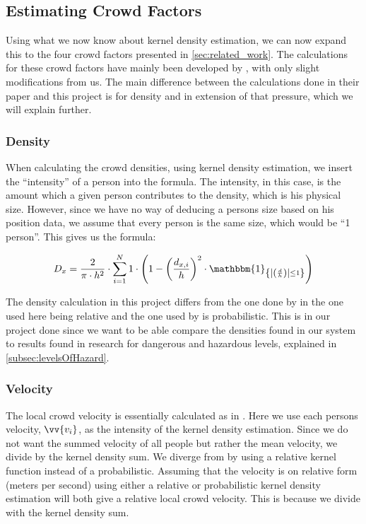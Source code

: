 \subsection{Estimating Crowd Factors}
\label{subsec:estimatingCrowdFactors}
Using what we now know about kernel density estimation, we can now expand this to the four crowd factors presented in \cref{sec:related_work}. The calculations for these crowd factors have mainly been developed by \citet{wirz2012inferring}, with only slight modifications from us. The main difference between the calculations done in their paper and this project is for density and in extension of that pressure, which we will explain further.

\subsubsection{Density}
When calculating the crowd densities, using kernel density estimation, we insert the \enquote{intensity} of a person into the formula. The intensity, in this case, is the amount which a given person contributes to the density, which is his physical size. However, since we have no way of deducing a persons size based on his position data, we assume that every person is the same size, which would be \enquote{1 person}. This gives us the formula:

\begin{equation}
D_x = \frac{2}{\pi \cdot h^2} \cdot \sum_{i=1}^N 1 \cdot \left(1-\left(\frac{d_{x,i}}{h}\right)^2 \cdot \mathbbm{1}_{\left\{\left|\left(\frac{d}{h}\right)\right| \leq 1\right\}}\right)
\end{equation}

The density calculation in this project differs from the one done by \citet{wirz2012inferring} in the one used here being relative and the one used by \citet{wirz2012inferring} is probabilistic. This is in our project done since we want to be able compare the densities found in our system to results found in research for dangerous and hazardous levels, explained in \cref{subsec:levelsOfHazard}.

\subsubsection{Velocity}
The local crowd velocity is essentially calculated as in \citet{wirz2012inferring}. Here we use each persons velocity, $\vv{v_i}$, as the intensity of the kernel density estimation. Since we do not want the summed velocity of all people but rather the mean velocity, we divide by the kernel density sum. We diverge from \citet{wirz2012inferring} by using a relative kernel function instead of a probabilistic. Assuming that the velocity is on relative form (meters per second) using either a relative or probabilistic kernel density estimation will both give a relative local crowd velocity. This is because we divide with the kernel density sum.

